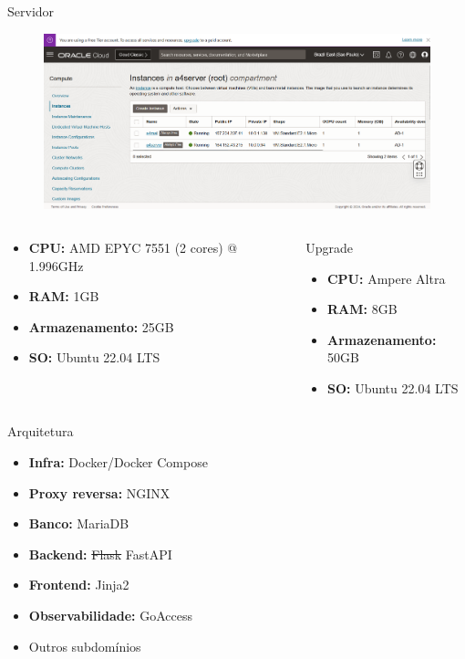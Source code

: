 \documentclass{beamer}
\begin{document}
\begin{frame}{Servidor}
    \begin{figure}[ht]
        \begin{center}
        \includegraphics[width=0.6\linewidth]{img/oracle.png}
        \label{fig:UI}
        \end{center}
    \end{figure}
    \pause
    \begin{columns}
        \begin{column}{0.5\textwidth}
            \begin{itemize}
                \item \textbf{CPU:} AMD EPYC 7551 (2 cores) @ 1.996GHz
                \item \textbf{RAM:} 1GB
                \item \textbf{Armazenamento:} 25GB
                \item \textbf{SO:} Ubuntu 22.04 LTS
            \end{itemize}
        \end{column}
        \pause
        \begin{column}{0.5\textwidth}
            Upgrade
            \begin{itemize}
                \item \textbf{CPU:} Ampere Altra
                \item \textbf{RAM:} 8GB
                \item \textbf{Armazenamento:} 50GB
                \item \textbf{SO:} Ubuntu 22.04 LTS
            \end{itemize}
        \end{column}
    \end{columns}
\end{frame}

\begin{frame}{Arquitetura}
    \begin{itemize}
        \item \textbf{Infra:} Docker/Docker Compose
        \pause
        \item \textbf{Proxy reversa:} NGINX
        \pause
        \item \textbf{Banco:} MariaDB
        \pause
        \item \textbf{Backend:} \st{Flask} FastAPI
        \pause
        \item \textbf{Frontend:} Jinja2
        \pause
        \item \textbf{Observabilidade:} GoAccess
        \item Outros subdomínios
    \end{itemize}
\end{frame}
\end{document}
